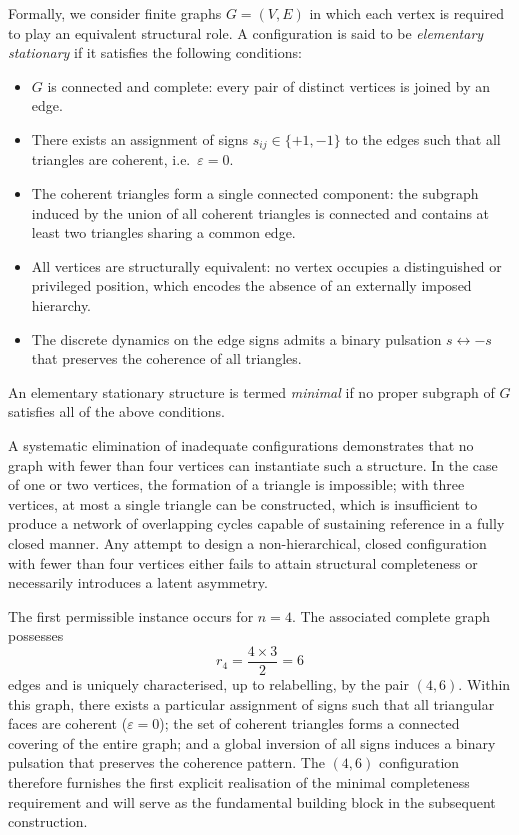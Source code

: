 \documentclass[11pt,a4paper]{article}
\begin{document}
Formally, we consider finite graphs \(G = (V,E)\) in which each vertex is required to play an equivalent structural role. A configuration is said to be \emph{elementary stationary} if it satisfies the following conditions:
\begin{itemize}
  \item \(G\) is connected and complete: every pair of distinct vertices is joined by an edge.
  \item There exists an assignment of signs \(s_{ij} \in \{+1,-1\}\) to the edges such that all triangles are coherent, i.e.\ \(\varepsilon = 0\).
  \item The coherent triangles form a single connected component: the subgraph induced by the union of all coherent triangles is connected and contains at least two triangles sharing a common edge.
  \item All vertices are structurally equivalent: no vertex occupies a distinguished or privileged position, which encodes the absence of an externally imposed hierarchy.
  \item The discrete dynamics on the edge signs admits a binary pulsation \(s \leftrightarrow -s\) that preserves the coherence of all triangles.
\end{itemize}
An elementary stationary structure is termed \emph{minimal} if no proper subgraph of \(G\) satisfies all of the above conditions.

A systematic elimination of inadequate configurations demonstrates that no graph with fewer than four vertices can instantiate such a structure. In the case of one or two vertices, the formation of a triangle is impossible; with three vertices, at most a single triangle can be constructed, which is insufficient to produce a network of overlapping cycles capable of sustaining reference in a fully closed manner. Any attempt to design a non-hierarchical, closed configuration with fewer than four vertices either fails to attain structural completeness or necessarily introduces a latent asymmetry.

The first permissible instance occurs for \(n = 4\). The associated complete graph possesses
\[
  r_4 = \frac{4 \times 3}{2} = 6
\]
edges and is uniquely characterised, up to relabelling, by the pair \((4,6)\). Within this graph, there exists a particular assignment of signs such that all triangular faces are coherent (\(\varepsilon = 0\)); the set of coherent triangles forms a connected covering of the entire graph; and a global inversion of all signs induces a binary pulsation that preserves the coherence pattern. The \((4,6)\) configuration therefore furnishes the first explicit realisation of the minimal completeness requirement and will serve as the fundamental building block in the subsequent construction.
\end{document}

